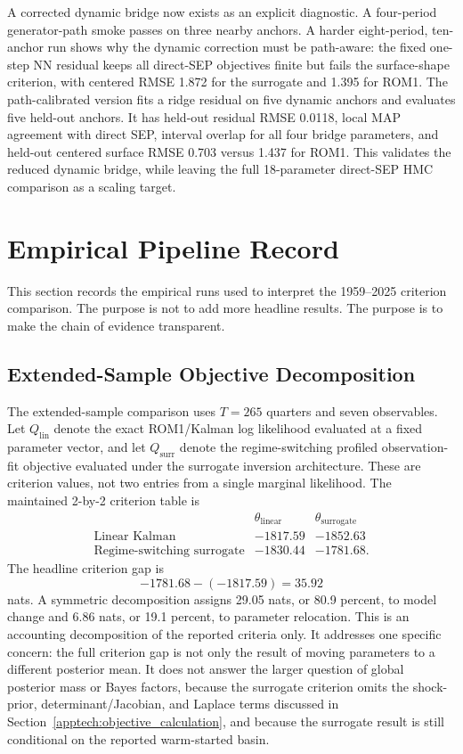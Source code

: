 \documentclass[12pt]{article}
\begin{document}
A corrected dynamic bridge now exists as an explicit diagnostic. A
four-period generator-path smoke passes on three nearby anchors. A harder
eight-period, ten-anchor run shows why the dynamic correction must be
path-aware: the fixed one-step NN residual keeps all direct-SEP objectives
finite but fails the surface-shape criterion, with centered RMSE 1.872 for the
surrogate and 1.395 for ROM1. The path-calibrated version fits a ridge residual
on five dynamic anchors and evaluates five held-out anchors. It has held-out
residual RMSE 0.0118, local MAP agreement with direct SEP, interval overlap for
all four bridge parameters, and held-out centered surface RMSE 0.703 versus
1.437 for ROM1. This validates the reduced dynamic bridge, while leaving the
full 18-parameter direct-SEP HMC comparison as a scaling target.

\section{Empirical Pipeline Record}
\label{apptech:empirical_record}

This section records the empirical runs used to interpret the 1959--2025
criterion comparison. The purpose is not to add more headline results. The
purpose is to make the chain of evidence transparent.

\subsection{Extended-Sample Objective Decomposition}
\label{apptech:ll_decomposition}

The extended-sample comparison uses \(T=265\) quarters and seven observables.
Let \(Q_{\mathrm{lin}}\) denote the exact ROM1/Kalman log likelihood evaluated
at a fixed parameter vector, and let \(Q_{\mathrm{surr}}\) denote the
regime-switching profiled observation-fit objective evaluated under the
surrogate inversion architecture. These are criterion values, not two entries
from a single marginal likelihood. The maintained 2-by-2 criterion table is
\[
\begin{array}{lcc}
 & \theta_{\mathrm{linear}} & \theta_{\mathrm{surrogate}} \\
\text{Linear Kalman} & -1817.59 & -1852.63 \\
\text{Regime-switching surrogate} & -1830.44 & -1781.68 .
\end{array}
\]
The headline criterion gap is
\[
  -1781.68 - (-1817.59) = 35.92
\]
nats. A symmetric decomposition assigns 29.05 nats, or 80.9 percent, to model
change and 6.86 nats, or 19.1 percent, to parameter relocation. This is an
accounting decomposition of the reported criteria only. It addresses one
specific concern: the full criterion gap is not only the result of moving
parameters to a different posterior mean. It does not answer the larger
question of global posterior mass or Bayes factors, because the surrogate
criterion omits the shock-prior, determinant/Jacobian, and Laplace terms
discussed in Section~\ref{apptech:objective_calculation}, and because the
surrogate result is still conditional on the reported warm-started basin.
\end{document}
